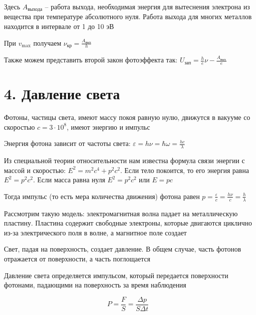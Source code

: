 \documentclass[12pt]{article}
\begin{document}
\smallvspace

Здесь $A_{\text{выхода}}$ -- работа выхода, необходимая энергия для вытеснения электрона из вещества при температуре абсолютного нуля. Работа выхода для многих металлов находится в интервале от 1 до 10 эВ

При $v_{\max}$ получаем $\nu_\text{кр} = \frac{A_\text{вых}}{h}$

Также можем представить второй закон фотоэффекта так: $U_\text{зап} = \frac{h}{e} \nu - \frac{A_\text{вых}}{e}$







\section{4. Давление света}

Фотоны, частицы света, имеют массу покоя равную нулю, движутся в вакууме со скоростью $c = 3 \cdot 10^8$, имеют энергию и импульс

Энергия фотона зависит от частоты света: $\varepsilon = h \nu = \hbar \omega = \frac{h c}{\lambda}$

Из специальной теории относительности нам известна формула связи энергии с массой и скоростью: $E^2 = m^2 c^4 + p^2 c^2$. Если тело покоится, то его энергия равна $E^2 = p^2 c^2$. Если масса равна нуля $E^2 = p^2 c^2$ или $E = p c$

Тогда импульс (то есть мера количества движения) фотона равен $p = \frac{\varepsilon}{c} = \frac{h \nu}{c} = \frac{h}{\lambda}$

Рассмотрим такую модель: электромагнитная волна падает на металлическую пластину. Пластина содержит свободные электроны, которые двигаются циклично из-за электрического поля в волне, а магнитное поле создает 

Свет, падая на поверхность, создает давление. В общем случае, часть фотонов отражается от поверхности, а часть поглощается

Давление света определяется импульсом, который передается поверхности фотонами, падающими на поверхность за время наблюдения

\[P = \frac{F}{S} = \frac{\Delta p}{S \Delta t}\]
\end{document}
